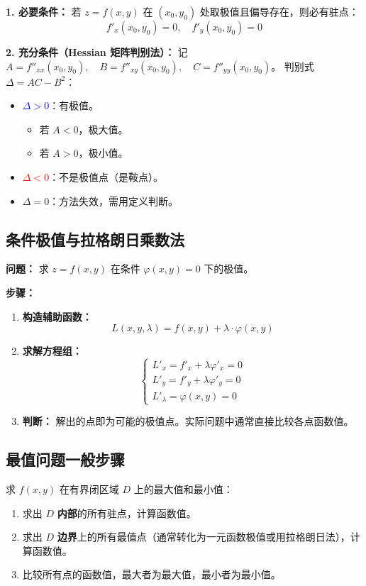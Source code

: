 \documentclass[a4paper,12pt]{ctexart}
\begin{document}
\textbf{1. 必要条件：}
若 $z=f(x,y)$ 在 $(x_0,y_0)$ 处取极值且偏导存在，则必有驻点：
\[ f'_x(x_0,y_0) = 0, \quad f'_y(x_0,y_0) = 0 \]

\textbf{2. 充分条件（Hessian 矩阵判别法）：}
记 $A = f''_{xx}(x_0,y_0), \quad B = f''_{xy}(x_0,y_0), \quad C = f''_{yy}(x_0,y_0)$。
判别式 $\Delta = AC - B^2$：
\begin{itemize}
    \item \textcolor{blue}{$\Delta > 0$}：有极值。
    \begin{itemize}
        \item 若 $A < 0$，极大值。
        \item 若 $A > 0$，极小值。
    \end{itemize}
    \item \textcolor{red}{$\Delta < 0$}：不是极值点（是鞍点）。
    \item $\Delta = 0$：方法失效，需用定义判断。
\end{itemize}

\subsection{条件极值与拉格朗日乘数法}

\textbf{问题：} 求 $z=f(x,y)$ 在条件 $\varphi(x,y)=0$ 下的极值。

\textbf{步骤：}
\begin{enumerate}
    \item \textbf{构造辅助函数：}
    \[ L(x,y,\lambda) = f(x,y) + \lambda \cdot \varphi(x,y) \]
    \item \textbf{求解方程组：}
    \[ \begin{cases} L'_x = f'_x + \lambda \varphi'_x = 0 \\ L'_y = f'_y + \lambda \varphi'_y = 0 \\ L'_\lambda = \varphi(x,y) = 0 \end{cases} \]
    \item \textbf{判断：} 解出的点即为可能的极值点。实际问题中通常直接比较各点函数值。
\end{enumerate}

\subsection{最值问题一般步骤}
求 $f(x,y)$ 在有界闭区域 $D$ 上的最大值和最小值：
\begin{enumerate}
    \item 求出 $D$ \textbf{内部}的所有驻点，计算函数值。
    \item 求出 $D$ \textbf{边界}上的所有最值点（通常转化为一元函数极值或用拉格朗日法），计算函数值。
    \item 比较所有点的函数值，最大者为最大值，最小者为最小值。
\end{enumerate}
\end{document}
